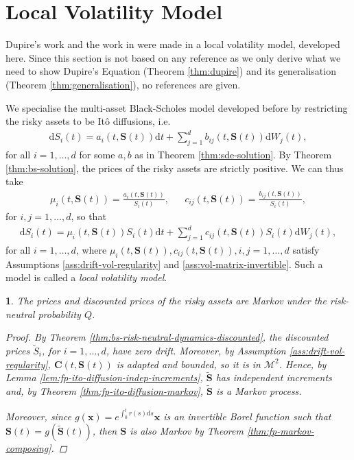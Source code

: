 \documentclass[english]{article}
\numberwithin{equation}{section}
\numberwithin{figure}{section}
\theoremstyle{bolddescit}
\newtheorem{theorem}{\protect\theoremname}[section]
\theoremstyle{definition}
\theoremstyle{definition}
\theoremstyle{plain}
\theoremstyle{plain}
\theoremstyle{bolddesc}
\theoremstyle{plain}
\theoremstyle{remark}
\providecommand{\theoremname}{Theorem}
\begin{document}
\section{Local Volatility Model}

Dupire's work and the work in \textcite{pablo_amster_towards_2009} were made in a local volatility model, developed here. Since this section is not based on any reference as we only derive what we need to show Dupire's Equation (Theorem \ref{thm:dupire}) and its generalisation (Theorem \ref{thm:generalisation}), no references are given.

We specialise the multi-asset Black-Scholes model developed before by restricting the risky assets to be It\^o diffusions, i.e.
\begin{align*}
  \mathrm{d}S_i(t) = a_i(t,\mathbf{S}(t)) \mathrm{d}t + \sum_{j=1}^{d} b_{ij}(t,\mathbf{S}(t)) \mathrm{d}W_j(t),
\end{align*}
for all $i=1,\ldots,d$ for some $a,b$ as in Theorem \ref{thm:sde-solution}. By Theorem \ref{thm:bs-solution}, the prices of the risky assets are strictly positive. We can thus take
\begin{align*}
  \mu_i(t,\mathbf{S}(t)) = \frac{a_i(t, \mathbf{S}(t))}{S_i(t)},
  && c_{ij}(t,\mathbf{S}(t)) = \frac{b_{ij}(t, \mathbf{S}(t))}{S_i(t)},
\end{align*}
for $i,j=1,\ldots,d$, so that
\begin{align*}
  \mathrm{d}S_i(t) = \mu_i(t,\mathbf{S}(t)) S_i(t) \mathrm{d}t + \sum_{j=1}^{d} c_{ij}(t,\mathbf{S}(t)) S_i(t) \mathrm{d}W_j(t),
\end{align*}
for all $i=1,\ldots,d$, where $\mu_i(t,\mathbf{S}(t)), c_{ij}(t,\mathbf{S}(t)), i,j=1,\ldots,d$ satisfy Assumptions \ref{ass:drift-vol-regularity} and \ref{ass:vol-matrix-invertible}. Such a model is called a \textit{local volatility model}.

\begin{theorem}\label{thm:local-stock-prices-markov}
  The prices and discounted prices of the risky assets are Markov under the risk-neutral probability $Q$.

  \begin{proof}
    By Theorem \ref{thm:bs-risk-neutral-dynamics-discounted}, the discounted prices $\widetilde{S}_i$, for $i=1,\ldots,d$, have zero drift. Moreover, by Assumption \ref{ass:drift-vol-regularity}, $\mathbf{C}(t,\mathbf{S}(t))$ is adapted and bounded, so it is in $\mathcal{M}^2$. Hence, by Lemma \ref{lem:fp-ito-diffusion-indep-increments}, $\widetilde{\mathbf{S}}$ has independent increments and, by Theorem \ref{thm:fp-ito-diffusion-markov}, $\widetilde{\mathbf{S}}$ is a Markov process.

    Moreover, since $g(\mathbf{x}) = e^{\int_0^t r(s) \mathrm{d}s} \mathbf{x}$ is an invertible Borel function such that $\mathbf{S}(t) = g(\widetilde{\mathbf{S}}(t))$, then $\mathbf{S}$ is also Markov by Theorem \ref{thm:fp-markov-composing}.
  \end{proof}
\end{theorem}
\end{document}
